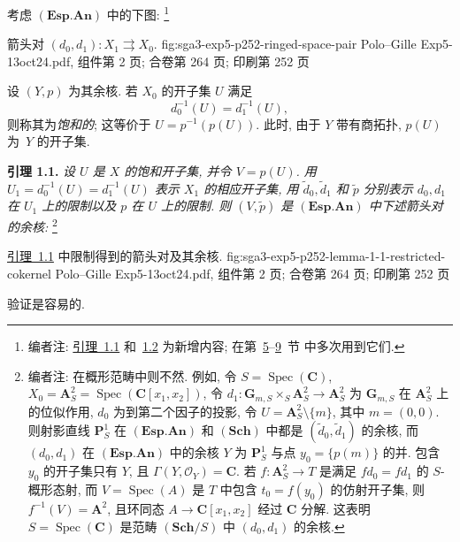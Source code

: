 考虑 \((\mathbf{Esp.An})\) 中的下图:%
\footnote{\label{note:sga3-V-3}编者注:
\hyperref[lem:sga3-V-1.1]{引理~1.1} 和~\hyperref[sga3:exp5:lemma:1.2]{1.2}
为新增内容; 在第~\hyperref[sec:sga3-V-5]{5}--\hyperref[sec:sga3-V-9]{9}~节
中多次用到它们.}

  {箭头对 \((d_0,d_1):X_1\rightrightarrows X_0\).}
  {fig:sga3-exp5-p252-ringed-space-pair}
  {Polo--Gille Exp5-13oct24.pdf, 组件第 2 页; 合卷第 264 页; 印刷第 252 页}

\noindent 设 \((Y,p)\) 为其余核. 若 \(X_0\) 的开子集 \(U\) 满足
\[
  d_0^{-1}(U)=d_1^{-1}(U),
\]
则称其为\emph{饱和的}; 这等价于 \(U=p^{-1}(p(U))\).
此时, 由于 \(Y\) 带有商拓扑, \(p(U)\) 为~\(Y\) 的开子集.

\medskip
{}\label{lem:sga3-V-1.1}%
\noindent\textbf{引理 1.1.}
\textit{设 \(U\) 是 \(X\) 的饱和开子集, 并令 \(V=p(U)\).
用 \(U_1=d_0^{-1}(U)=d_1^{-1}(U)\) 表示 \(X_1\) 的相应开子集,
用 \(\widetilde d_0,\widetilde d_1\) 和 \(\widetilde p\)
分别表示 \(d_0,d_1\) 在 \(U_1\) 上的限制以及 \(p\) 在 \(U\) 上的限制.
则 \((V,\widetilde p)\) 是 \((\mathbf{Esp.An})\) 中下述箭头对的余核:}%
\footnote{\label{note:sga3-V-4}编者注: 在概形范畴中则不然.
例如, 令 \(S=\operatorname{Spec}(\mathbf C)\),
\(X_0=\mathbf A^2_S=\operatorname{Spec}(\mathbf C[x_1,x_2])\),
令 \(d_1:\mathbf G_{m,S}\times_S\mathbf A^2_S\to\mathbf A^2_S\)
为 \(\mathbf G_{m,S}\) 在 \(\mathbf A^2_S\) 上的位似作用,
\(d_0\) 为到第二个因子的投影, 令 \(U=\mathbf A^2_S\setminus\{m\}\),
其中 \(m=(0,0)\). 则射影直线 \(\mathbf P^1_S\)
在 \((\mathbf{Esp.An})\) 和 \((\mathbf{Sch})\) 中都是
\((\widetilde d_0,\widetilde d_1)\) 的余核,
而 \((d_0,d_1)\) 在 \((\mathbf{Esp.An})\) 中的余核 \(Y\)
为 \(\mathbf P^1_S\) 与点 \(y_0=\{p(m)\}\) 的并.
包含 \(y_0\) 的开子集只有 \(Y\), 且
\(\Gamma(Y,\mathcal O_Y)=\mathbf C\).
若 \(f:\mathbf A^2_S\to T\) 是满足 \(f d_0=f d_1\) 的
\(S\)-概形态射, 而 \(V=\operatorname{Spec}(A)\) 是 \(T\)
中包含 \(t_0=f(y_0)\) 的仿射开子集, 则
\(f^{-1}(V)=\mathbf A^2\), 且环同态 \(A\to\mathbf C[x_1,x_2]\)
经过 \(\mathbf C\) 分解. 这表明
\(S=\operatorname{Spec}(\mathbf C)\) 是范畴 \((\mathbf{Sch}/S)\)
中 \((d_0,d_1)\) 的余核.}

  {\hyperref[lem:sga3-V-1.1]{引理~1.1} 中限制得到的箭头对及其余核.}
  {fig:sga3-exp5-p252-lemma-1-1-restricted-cokernel}
  {Polo--Gille Exp5-13oct24.pdf, 组件第 2 页; 合卷第 264 页; 印刷第 252 页}

验证是容易的.
